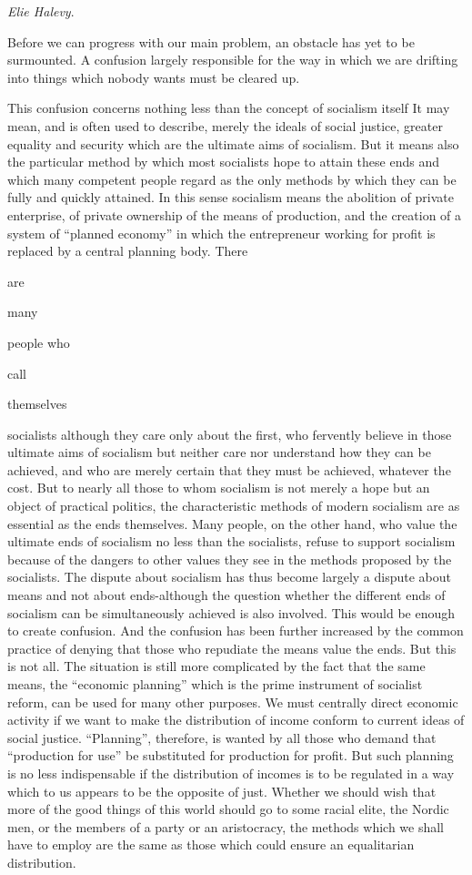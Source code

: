 \documentclass[11pt,openany]{book}
\begin{document}
\emph{Elie Halevy}.

Before we can progress with our main problem, an obstacle has yet to be surmounted. A confusion largely responsible for the way in which we are drifting into things which nobody wants must be cleared up.

This confusion concerns nothing less than the concept of socialism itself It may mean, and is often used to describe, merely the ideals of social justice, greater equality and security which are the ultimate aims of socialism. But it means also the particular method by which most socialists hope to attain these ends and which many competent people regard as the only methods by which they can be fully and quickly attained. In this sense socialism means the abolition of private enterprise, of private ownership of the means of production, and the creation of a system of ``planned economy'' in which the entrepreneur working for profit is replaced by a central planning body. There

are

many

people who

call

themselves

socialists although they care only about the first, who fervently believe in those ultimate aims of socialism but neither care nor understand how they can be achieved, and who are merely certain that they must be achieved, whatever the cost. But to nearly all those to whom socialism is not merely a hope but an object of practical politics, the characteristic methods of modern socialism are as essential as the ends themselves. Many people, on the other hand, who value the ultimate ends of socialism no less than the socialists, refuse to support socialism because of the dangers to other values they see in the methods proposed by the socialists. The dispute about socialism has thus become largely a dispute about means and not about ends-although the question whether the different ends of socialism can be simultaneously achieved is also involved. This would be enough to create confusion. And the confusion has been further increased by the common practice of denying that those who repudiate the means value the ends. But this is not all. The situation is still more complicated by the fact that the same means, the ``economic planning'' which is the prime instrument of socialist reform, can be used for many other purposes. We must centrally direct economic activity if we want to make the distribution of income conform to current ideas of social justice. ``Planning'', therefore, is wanted by all those who demand that ``production for use'' be substituted for production for profit. But such planning is no less indispensable if the distribution of incomes is to be regulated in a way which to us appears to be the opposite of just. Whether we should wish that more of the good things of this world should go to some racial elite, the Nordic men, or the members of a party or an aristocracy, the methods which we shall have to employ are the same as those which could ensure an equalitarian distribution.
\end{document}
